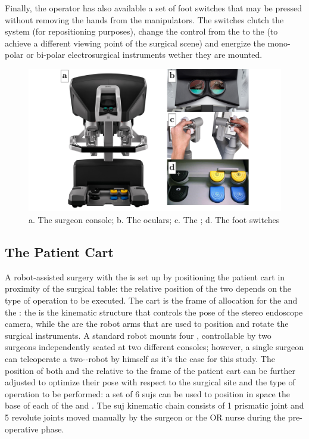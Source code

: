 \documentclass[../main.tex]{subfiles}
\begin{document}
Finally, the operator has also available a set of foot switches that may be pressed without removing the hands from the manipulators. The switches clutch the system (for repositioning purposes), change the control from the \psms to the \ecm (to achieve a different viewing point of the surgical scene) and energize the mono-polar or bi-polar electrosurgical instruments wether they are mounted.

\begin{figure}[h]
    \centering
    \includegraphics[width=\textwidth]{images/surgeon_cart_panel.png}
    \caption{a. The \davinci surgeon console; b. The \hrsv oculars; c. The \mtms; d. The foot switches}
    \label{fig:surgeonconsolepanel}
\end{figure}

\subsection{The Patient Cart}
A robot-assisted surgery with the \davinci is set up by positioning the patient cart in proximity of the surgical table: the relative position of the two depends on the type of operation to be executed. 
The cart is the frame of allocation for the \psms and the \ecm: the \ecm is the kinematic structure that controls the pose of the stereo endoscope camera, while the \psms are the robot arms that are used to position and rotate the surgical instruments. A standard \davinci robot mounts four \psms, controllable by two surgeons independently seated at two different consoles; however, a single surgeon can teleoperate a two-\psms-robot by himself as it's the case for this study.
The position of both \psms and the \ecm relative to the frame of the patient cart can be further adjusted to optimize their pose with respect to the surgical site and the type of operation to be performed: a set of 6 \acp{suj} can be used to position in space the base of each of the \psms and \ecm. The \ac{suj} kinematic chain consists of 1 prismatic joint and 5 revolute joints moved manually by the surgeon or the OR nurse during the pre-operative phase.
\end{document}
